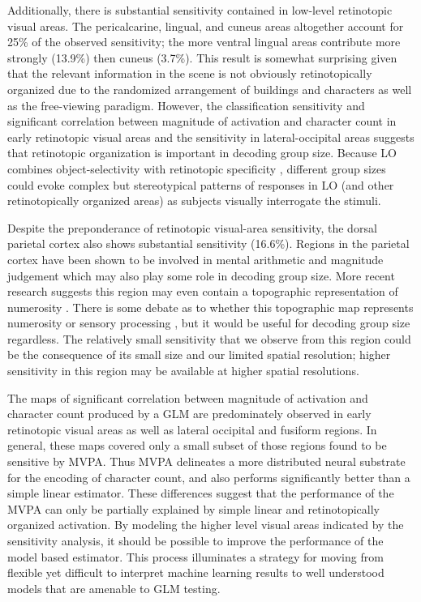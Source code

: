 \documentclass[5p,authoryear]{elsarticle}
\begin{document}
Additionally, there is substantial sensitivity contained in low-level retinotopic visual areas. 
The pericalcarine, lingual, and cuneus areas altogether account for 25\% of the observed sensitivity; the more ventral lingual areas contribute more strongly (13.9\%) then cuneus (3.7\%).
This result is somewhat surprising given that the relevant information in the scene is not obviously retinotopically organized due to the randomized arrangement of buildings and characters as well as the free-viewing paradigm.
However, the classification sensitivity and significant correlation between magnitude of activation and character count in early retinotopic visual areas and the sensitivity in lateral-occipital areas suggests that retinotopic organization is important in decoding group size. 
Because LO combines object-selectivity with retinotopic specificity \citep{Sayres2008}, different group sizes could evoke complex but stereotypical patterns of responses in LO (and other retinotopically organized areas) as subjects visually interrogate the stimuli. 

Despite the preponderance of retinotopic visual-area sensitivity, the dorsal parietal cortex also shows substantial sensitivity (16.6\%).
Regions in the parietal cortex have been shown to be involved in mental arithmetic and magnitude judgement \citep{Rickard2000} which may also play some role in decoding group size.
More recent research suggests this region may even contain a topographic representation of numerosity \citep{Harvey2013}.
There is some debate as to whether this topographic map represents numerosity or sensory processing \citep{Gebuis2013}, but it would be useful for decoding group size regardless. 
The relatively small sensitivity that we observe from this region could be the consequence of its small size and our limited spatial resolution; higher sensitivity in this region may be available at higher spatial resolutions.

The maps of significant correlation between magnitude of activation and character count produced by a GLM are predominately observed in early retinotopic visual areas as well as lateral occipital and fusiform regions.
In general, these maps covered only a small subset of those regions found to be sensitive by MVPA.
Thus MVPA delineates a more distributed neural substrate for the encoding of character count, and also performs significantly better than a simple linear estimator.
These differences suggest that the performance of the MVPA can only be partially explained by simple linear and retinotopically organized activation.
By modeling the higher level visual areas indicated by the sensitivity analysis, it should be possible to improve the performance of the model based estimator.
This process illuminates a strategy for moving from flexible yet difficult to interpret machine learning results to well understood models that are amenable to GLM testing.
\end{document}
